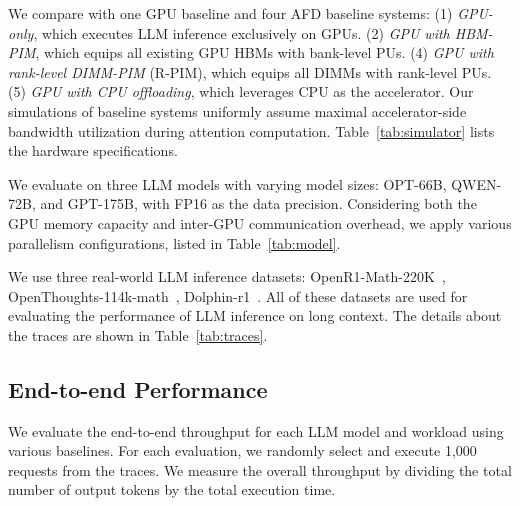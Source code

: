 We compare \sys with one GPU baseline and four AFD baseline systems: 
(1) \emph{GPU-only}, which executes LLM inference exclusively on GPUs. 
(2) \emph{GPU with HBM-PIM}, which equips all existing GPU HBMs with bank-level PUs.
(4) \emph{GPU with rank-level DIMM-PIM} (R-PIM), which equips all DIMMs with rank-level PUs.
(5) \emph{GPU with CPU offloading}, which leverages CPU as the accelerator.
Our simulations of baseline systems uniformly assume maximal accelerator-side bandwidth utilization during attention computation.
Table~\ref{tab:simulator} lists the hardware specifications. 




We evaluate \sys on three LLM models with varying model sizes: OPT-66B, QWEN-72B, and GPT-175B, with FP16 as the data precision.
Considering both the GPU memory capacity and inter-GPU communication overhead, we apply various parallelism configurations, listed in Table~\ref{tab:model}.

We use three real-world LLM inference datasets: OpenR1-Math-220K~\cite{open-r1}, OpenThoughts-114k-math~\cite{OpenThoughts-114k-math}, Dolphin-r1~\cite{dophin}.
All of these datasets are used for evaluating the performance of LLM inference on long context. 
The details about the traces are shown in Table~\ref{tab:traces}.




\subsection{End-to-end Performance}
\label{sec:eval-end-to-end}
We evaluate the end-to-end throughput for each LLM model and workload using various baselines.
For each evaluation, we randomly select and execute 1,000 requests from the traces. 
We measure the overall throughput by dividing the total number of output tokens by the total execution time.

